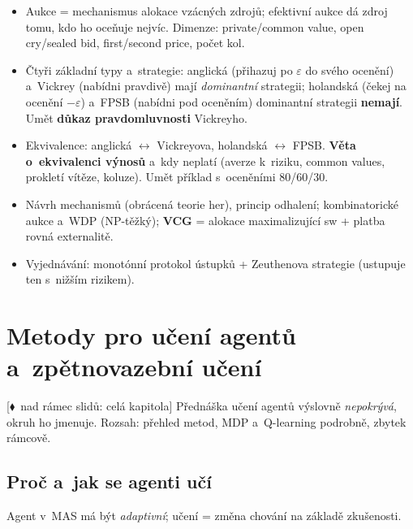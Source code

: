 \documentclass[11pt,a4paper]{article}
\theoremstyle{definition}
\newcommand{\mimoq}[1]{\textcolor{markcol}{\textsf{\footnotesize[$\blacklozenge$~nad rámec slidů: #1]}}}
\begin{document}
\begin{itemize}
  (cyklická kolektivní preference); kritéria Pareto, Condorcetův vítěz, IIA, univerzalita,
  nediktátorství; \textbf{Arrowova věta} (Pareto + IIA $\Rightarrow$ diktatura);
  Gibbard--Satterthwaite (každý systém lze manipulovat).
\item Aukce = mechanismus alokace vzácných zdrojů; efektivní aukce dá zdroj tomu, kdo ho oceňuje
  nejvíc. Dimenze: private/common value, open cry/sealed bid, first/second price, počet kol.
\item Čtyři základní typy a~strategie: anglická (přihazuj po $\varepsilon$ do svého ocenění)
  a~Vickrey (nabídni pravdivě) mají \emph{dominantní} strategii; holandská (čekej na ocenění
  $-\varepsilon$) a~FPSB (nabídni pod oceněním) dominantní strategii \textbf{nemají}.
  Umět \textbf{důkaz pravdomluvnosti} Vickreyho.
\item Ekvivalence: anglická $\leftrightarrow$ Vickreyova, holandská $\leftrightarrow$ FPSB.
  \textbf{Věta o~ekvivalenci výnosů} a~kdy neplatí (averze k~riziku, common values, prokletí
  vítěze, koluze). Umět příklad s~oceněními 80/60/30.
\item Návrh mechanismů (obrácená teorie her), princip odhalení; kombinatorické aukce a~WDP
  (NP-těžký); \textbf{VCG} = alokace maximalizující sw + platba rovná externalitě.
\item Vyjednávání: monotónní protokol ústupků + Zeuthenova strategie (ustupuje ten s~nižším
  rizikem).
\end{itemize}

\section{Metody pro učení agentů a~zpětnovazební učení}
\label{sec:uceni}

\noindent\mimoq{celá kapitola} Přednáška učení agentů výslovně \emph{nepokrývá}, okruh ho
jmenuje. Rozsah: přehled metod, MDP a~Q-learning podrobně, zbytek rámcově.
\subsection{Proč a~jak se agenti učí}

Agent v~MAS má být \emph{adaptivní}; učení = změna chování na základě zkušenosti.
\end{document}
